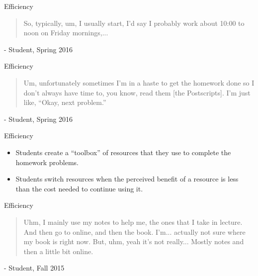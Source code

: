 \documentclass[xcolor=x11names,compress]{beamer}
\begin{document}
\begin{frame}{Efficiency}
	\begin{quote}
		So, typically, um, I usually start, I'd say I probably work about 10:00 to noon on Friday mornings,...
	\end{quote}
	\vspace{5mm}
	- Student, Spring 2016
\end{frame}

\begin{frame}{Efficiency}
	\begin{quote}
		Um, unfortunately sometimes I'm in a haste to get the homework done so I don't always have time to, you know, read them [the Postscripts]. I'm just like, ``Okay, next problem.''
	\end{quote}
	\vspace{5mm}
	- Student, Spring 2016
\end{frame}

\begin{frame}{Efficiency}
	\begin{itemize}
		\item Students create a ``toolbox'' of resources that they use to complete the homework problems.
		\vspace{3mm}
		\item Students switch resources when the perceived benefit of a resource is less than the cost needed to continue using it.
	\end{itemize}
\end{frame}

\begin{frame}{Efficiency}
	\begin{quote}
		Uhm, I mainly use my notes to help me, the ones that I take in lecture. And then go to online, and then the book. I'm... actually not sure where my book is right now. But, uhm, yeah it's not really... Mostly notes and then a little bit online.
	\end{quote}
	\vspace{5mm}
	- Student, Fall 2015
\end{frame}
\end{document}
